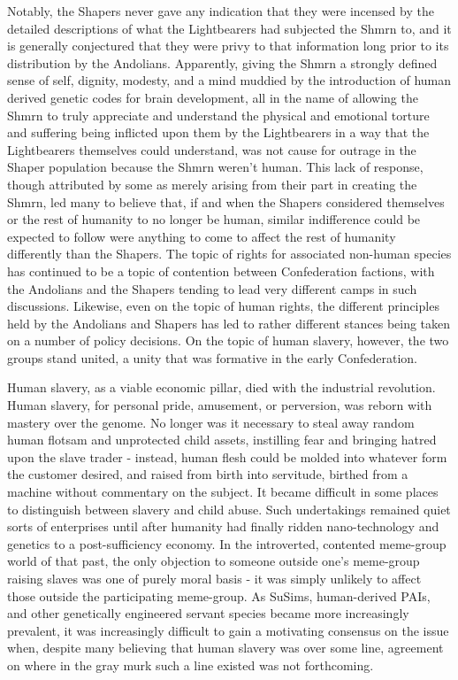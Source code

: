 Notably, the Shapers never gave any indication that they were incensed
by the detailed descriptions of what the Lightbearers had subjected
the Shmrn to, and it is generally conjectured that they were privy to
that information long prior to its distribution by the
Andolians. Apparently, giving the Shmrn a strongly defined sense of
self, dignity, modesty, and a mind muddied by the introduction of
human derived genetic codes for brain development, all in the name of
allowing the Shmrn to truly appreciate and understand the physical and
emotional torture and suffering being inflicted upon them by the
Lightbearers in a way that the Lightbearers themselves could
understand, was not cause for outrage in the Shaper population because
the Shmrn weren't human. This lack of response, though attributed by
some as merely arising from their part in creating the Shmrn, led many
to believe that, if and when the Shapers considered themselves or the
rest of humanity to no longer be human, similar indifference could be
expected to follow were anything to come to affect the rest of
humanity differently than the Shapers. The topic of rights for
associated non-human species has continued to be a topic of contention
between Confederation factions, with the Andolians and the Shapers
tending to lead very different camps in such discussions. Likewise,
even on the topic of human rights, the different principles held by
the Andolians and Shapers has led to rather different stances being
taken on a number of policy decisions. On the topic of human slavery,
however, the two groups stand united, a unity that was formative in
the early Confederation.

Human slavery, as a viable economic pillar, died with the industrial
revolution. Human slavery, for personal pride, amusement, or
perversion, was reborn with mastery over the genome. No longer was it
necessary to steal away random human flotsam and unprotected child
assets, instilling fear and bringing hatred upon the slave trader -
instead, human flesh could be molded into whatever form the customer
desired, and raised from birth into servitude, birthed from a machine
without commentary on the subject. It became difficult in some places
to distinguish between slavery and child abuse. Such undertakings
remained quiet sorts of enterprises until after humanity had finally
ridden nano-technology and genetics to a post-sufficiency economy. In
the introverted, contented meme-group world of that past, the only
objection to someone outside one's meme-group raising slaves was one
of purely moral basis - it was simply unlikely to affect those outside
the participating meme-group. As SuSims, human-derived PAIs, and other
genetically engineered servant species became more increasingly
prevalent, it was increasingly difficult to gain a motivating
consensus on the issue when, despite many believing that human slavery
was over some line, agreement on where in the gray murk such a line
existed was not forthcoming.

